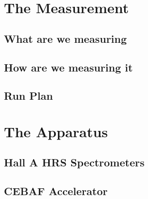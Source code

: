 \section{The Measurement}
\subsection{What are we measuring}
\subsection{How are we measuring it}
\subsection{Run Plan}

\section{The Apparatus}
\subsection{Hall A HRS Spectrometers}
\subsection{CEBAF Accelerator}

